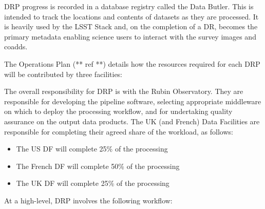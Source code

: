 DRP progress is recorded in a database registry called the Data Butler. This is intended to track the locations and contents of datasets as they are processed. It is heavily used by the LSST Stack and, on the completion of a DR, becomes the primary metadata enabling science users to interact with the survey images and coadds.

The Operations Plan (** ref **) details how the resources required for each DRP will be contributed by three facilities:

The overall responsibility for DRP is with the Rubin Observatory. They are responsible for developing the pipeline software, selecting appropriate middleware on which to deploy the processing workflow, and for undertaking quality assurance on the output data products. The UK (and French) Data Facilities are responsible for completing their agreed share of the workload, as follows:

\begin{itemize}

\item The US DF will complete 25\% of the processing

\item The French DF will complete 50\% of the processing

\item The UK DF will complete 25\% of the processing

\end{itemize}

At a high-level, DRP involves the following workflow:

